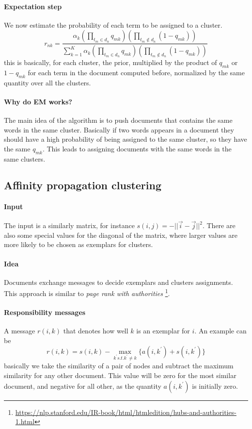\paragraph{Expectation step}
We now estimate the probability of each term to be assigned to a cluster.
$$r_{nk} = \frac{\alpha_k(\prod_{t_m \in d_n}q_{mk})(\prod_{t_m \notin d_n}(1-q_{mk}))}
{\sum_{k=1}^K\alpha_k(\prod_{t_m \in d_n}q_{mk})(\prod_{t_m \notin d_n}(1-q_{mk}))}$$
this is basically, for each cluster, the prior, multiplied by the product of $q_{mk}$ or $1- q_{mk}$ for each 
term in the document
computed before, 
normalized by the same quantity over all the clusters.

\paragraph{Why do EM works?}
The main idea of the algorithm is to push documents that contains the same 
words in the same cluster. Basically if two words appears in a document 
they should have a high probability of being assigned to the same cluster, 
so they have the same $q_{mk}$. This leads to assigning documents with the 
same words in the same clusters.

\subsection{Affinity propagation clustering}

\paragraph{Input}
The input is a similarly matrix, for instance $s(i,j) = - ||\vec{i} - \vec{j}||^2$.
There are also some special values for the diagonal of the matrix, 
where larger values are more likely to be chosen as exemplars for 
clusters.

\paragraph{Idea}
Documents exchange messages to decide exemplars and clusters assignments.
This approach is similar to \emph{page rank with authorities} \footnote{\url{https://nlp.stanford.edu/IR-book/html/htmledition/hubs-and-authorities-1.html}}. 

\paragraph{Responsibility messages}
A message $r(i,k)$ that denotes how well $k$ is an exemplar for $i$.
An example can be
$$r(i, k) = s(i, k) - \max_{k^\prime s.t.k^\prime \neq k} \{ a(i, k^\prime) + s(i, k^\prime)\}$$
basically we take the similarity of a pair of nodes and subtract the maximum 
similarity for any other document. This value will be zero for the most similar 
document, and negative for all other, as the quantity $a(i, k^\prime)$ is initially zero.

